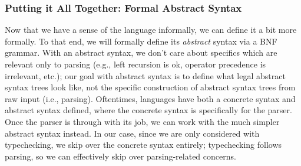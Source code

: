 \subsubsection{Putting it All Together: Formal Abstract Syntax}
Now that we have a sense of the language informally, we can define it a bit more formally.
To that end, we will formally define its \emph{abstract} syntax via a BNF grammar.
With an abstract syntax, we don't care about specifics which are relevant only to parsing (e.g., left recursion is ok, operator precedence is irrelevant, etc.); our goal with abstract syntax is to define what legal abstract syntax trees look like, not the specific construction of abstract syntax trees from raw input (i.e., parsing).
Oftentimes, languages have both a concrete syntax and abstract syntax defined, where the concrete syntax is specifically for the parser.
Once the parser is through with its job, we can work with the much simpler abstract syntax instead.
In our case, since we are only considered with typechecking, we skip over the concrete syntax entirely; typechecking follows parsing, so we can effectively skip over parsing-related concerns.

